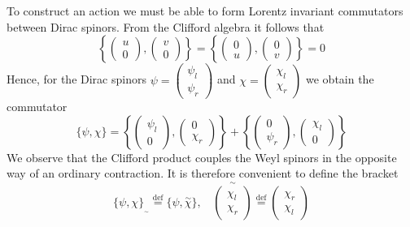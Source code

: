 \documentclass[a4paper,a4paper]{article}
\begin{document}
To construct an action we must be able to form Lorentz invariant commutators
between Dirac spinors. From the Clifford algebra it follows that
\begin{equation}
\left \{ \left( \begin{array}{c}u\\0 \end{array}
\right),\left( \begin{array}{c}v\\0 \end{array} \right) \right
\}= \left \{ \left( \begin{array}{c}0\\u \end{array}
\right),\left( \begin{array}{c}0\\v \end{array} \right) \right
\}=0 
\label{c2}
\end{equation}
Hence, for the Dirac spinors $ \psi = ( \begin{array}{c} \psi _{l}\\ \psi _{r}
\end{array} )$ and $\chi  = ( \begin{array}{c} \chi  _{l}\\ \chi _{r}
\end{array})$
we obtain the commutator
\begin{equation} 
\{ \psi , \chi \}= \left \{ \left( \begin{array}{c} \psi_{l} \\ 0  \end{array}
\right),  \left( \begin{array}{c} 0\\ \chi_{r}  \end{array} \right)
\right \} + \left \{ \left( \begin{array}{c} 0\\\psi_{r}  \end{array} \right),
\left( \begin{array}{c} \chi_{l}\\0 \  \end{array} \right) \right \}
\label{c3}
\end{equation}
We observe that the Clifford product couples the Weyl spinors in the opposite
way of an ordinary contraction. It is therefore convenient to define the bracket
\begin{equation} 
\{ \psi, \chi \}_{_{\sim }}  \stackrel{ \mathrm{def}}{=}  \{ \psi ,
\stackrel{\sim}{ \chi} \} , \ \ \ \  \stackrel{\sim}{ \left( \begin{array}{c}
\chi_{l}\\
\chi_{r} \end{array} \right)}  \stackrel{ \mathrm{def}}{=} \left(
\begin{array}{c} \chi_{r}\\ \chi_{l}  \end{array} \right)   
\label{c4}
\end{equation}
\end{document}
